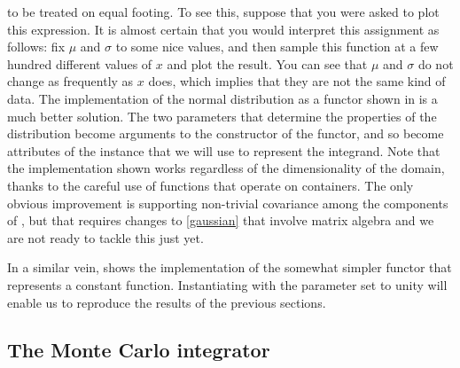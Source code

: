 to be treated on equal footing. To see this, suppose that you were asked to plot this
expression. It is almost certain that you would interpret this assignment as follows: fix $\mu$
and $\sigma$ to some nice values, and then sample this function at a few hundred different
values of $x$ and plot the result. You can see that $\mu$ and $\sigma$ do not change as
frequently as $x$ does, which implies that they are not the same kind of data. The
implementation of the normal distribution as a functor shown in  is
a much better solution.
%
%
The two parameters that determine the properties of the distribution become arguments to the
constructor of the functor, and so become attributes of the instance that we will use to
represent the integrand. Note that the implementation shown works regardless of the
dimensionality of the domain, thanks to the careful use of functions that operate on
containers. The only obvious improvement is supporting non-trivial covariance among the
components of , but that requires changes to \eqref{gaussian} that involve
matrix algebra and we are not ready to tackle this just yet.

In a similar vein,  shows the implementation of the somewhat
simpler functor  that represents a constant function. Instantiating
 with the parameter  set to unity will enable us to
reproduce the results of the previous sections.
%
%

\subsection{The Monte Carlo integrator}
\label{sec:classes:driver:final}

